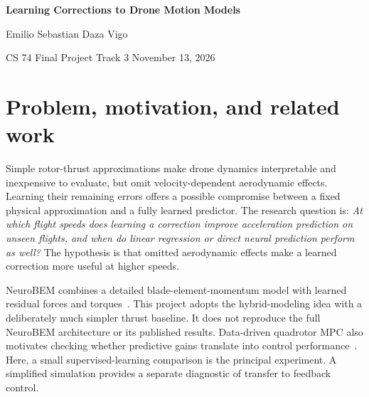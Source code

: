 \documentclass[10pt,letterpaper]{article}
\newcommand{\unit}{\ensuremath{\mathrm{m\,s^{-2}}}}
\begin{document}
\begin{center}
{\LARGE\bfseries Learning Corrections to Drone Motion Models}\par
\vspace{5pt}
{\large Emilio Sebastian Daza Vigo}\par
CS 74 Final Project \quad Track 3 \quad November 13, 2026
\end{center}
\vspace{-8pt}
\begin{abstract}
This project tests whether a small neural residual improves a simplified quadrotor thrust model and whether its benefit changes with flight speed. Five regressors predict the released NeuroBEM body-frame acceleration channels from ten contemporaneous inputs. All segments of each flight remain in one partition, with 65 training, 17 validation, and 13 test flights. Across three training seeds, direct and residual networks attain overall test RMSEs of $0.4985$ and $0.4906$~\unit, respectively. Below $5$~m/s, the direct network performs better. At or above $5$~m/s, the residual network reduces pooled RMSE by $2.7\%$ and outperforms the direct network on 10 of 12 eligible flights. A separate Isaac Sim showcase does not preserve this ranking: the direct controller tracks slightly better at an initial speed of $6$~m/s. The results support a modest, speed-dependent prediction benefit within this dataset, with limited evidence for improved control.
\end{abstract}
\vspace{-9pt}
\section{Problem, motivation, and related work}
Simple rotor-thrust approximations make drone dynamics interpretable and inexpensive to evaluate, but omit velocity-dependent aerodynamic effects. Learning their remaining errors offers a possible compromise between a fixed physical approximation and a fully learned predictor. The research question is: \emph{At which flight speeds does learning a correction improve acceleration prediction on unseen flights, and when do linear regression or direct neural prediction perform as well?} The hypothesis is that omitted aerodynamic effects make a learned correction more useful at higher speeds.

NeuroBEM combines a detailed blade-element-momentum model with learned residual forces and torques~\cite{bauersfeld2021neurobem}. This project adopts the hybrid-modeling idea with a deliberately much simpler thrust baseline. It does not reproduce the full NeuroBEM architecture or its published results. Data-driven quadrotor MPC also motivates checking whether predictive gains translate into control performance~\cite{torrente2021mpc}. Here, a small supervised-learning comparison is the principal experiment. A simplified simulation provides a separate diagnostic of transfer to feedback control.
\end{document}
